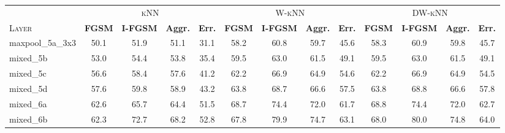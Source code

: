 \begin{table}
\renewcommand{\tabcolsep}{3pt}
%
%
\begin{tabularx}{\linewidth}{Xcccccccccccc}
\toprule
                 & \multicolumn{4}{c}{\textsc{kNN}} & \multicolumn{4}{c}{\textsc{W-kNN}} & \multicolumn{4}{c}{\textsc{DW-kNN}} \\
                   \cmidrule(lr){2-5}                 \cmidrule(lr){6-9}                   \cmidrule(lr){10-13}
\textsc{Layer}   &  \multicolumn{1}{c}{\footnotesize\textbf{FGSM}} &  \multicolumn{1}{c}{\sloppy\footnotesize\textbf{I-FGSM}} &  \multicolumn{1}{c}{\footnotesize\textbf{Aggr.}} &  \multicolumn{1}{c}{\footnotesize\textbf{Err.}}
                 &  \multicolumn{1}{c}{\footnotesize\textbf{FGSM}} &  \multicolumn{1}{c}{\sloppy\footnotesize\textbf{I-FGSM}} &  \multicolumn{1}{c}{\footnotesize\textbf{Aggr.}} &  \multicolumn{1}{c}{\footnotesize\textbf{Err.}}
                 &  \multicolumn{1}{c}{\footnotesize\textbf{FGSM}} &  \multicolumn{1}{c}{\sloppy\footnotesize\textbf{I-FGSM}} &  \multicolumn{1}{c}{\footnotesize\textbf{Aggr.}} &  \multicolumn{1}{c}{\footnotesize\textbf{Err.}} \\
\midrule
maxpool\_5a\_3x3 &          50.1 &          51.9 &          51.1 &          31.1 &          58.2 &          60.8 &          59.7 &          45.6 &          58.3 &          60.9 &          59.8 &          45.7 \\
mixed\_5b        &          53.0 &          54.4 &          53.8 &          35.4 &          59.5 &          63.0 &          61.5 &          49.1 &          59.5 &          63.0 &          61.5 &          49.1 \\
mixed\_5c        &          56.6 &          58.4 &          57.6 &          41.2 &          62.2 &          66.9 &          64.9 &          54.6 &          62.2 &          66.9 &          64.9 &          54.5 \\
mixed\_5d        &          57.6 &          59.8 &          58.9 &          43.2 &          63.8 &          68.7 &          66.6 &          57.5 &          63.8 &          68.8 &          66.6 &          57.8 \\
mixed\_6a        &          62.6 &          65.7 &          64.4 &          51.5 &          68.7 &          74.4 &          72.0 &          61.7 &          68.8 &          74.4 &          72.0 &          62.7 \\
mixed\_6b        &          62.3 &          72.7 &          68.2 &          52.8 &          67.8 &          79.9 &          74.7 &          63.1 &          68.0 &          80.0 &          74.8 &          64.0 \\

\end{tabularx}
\end{table}
